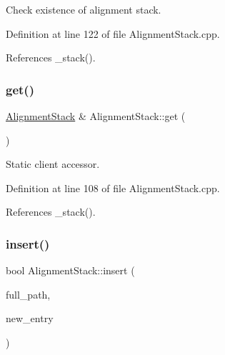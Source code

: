 Check existence of alignment stack. 



Definition at line 122 of file Alignment\+Stack.\+cpp.



References \+\_\+stack().

\hypertarget{class_d_d4hep_1_1_alignments_1_1_alignment_stack_aa39f02a46ed00baec0b3a09e42e3af1c}{}\label{class_d_d4hep_1_1_alignments_1_1_alignment_stack_aa39f02a46ed00baec0b3a09e42e3af1c} 
\subsubsection{\texorpdfstring{get()}{get()}}
{\footnotesize\ttfamily \hyperlink{class_d_d4hep_1_1_alignments_1_1_alignment_stack}{Alignment\+Stack} \& Alignment\+Stack\+::get (\begin{DoxyParamCaption}{ }\end{DoxyParamCaption})\hspace{0.3cm}{\ttfamily [static]}}



Static client accessor. 



Definition at line 108 of file Alignment\+Stack.\+cpp.



References \+\_\+stack().

\hypertarget{class_d_d4hep_1_1_alignments_1_1_alignment_stack_a9970de258fa1c3ea148a70de782f2398}{}\label{class_d_d4hep_1_1_alignments_1_1_alignment_stack_a9970de258fa1c3ea148a70de782f2398} 
\subsubsection{\texorpdfstring{insert()}{insert()}\hspace{0.1cm}{\footnotesize\ttfamily [1/2]}}
{\footnotesize\ttfamily bool Alignment\+Stack\+::insert (\begin{DoxyParamCaption}\item[{const std\+::string \&}]{full\+\_\+path,  }\item[{\hyperlink{class_d_d4hep_1_1dd4hep__ptr}{dd4hep\+\_\+ptr}$<$ \hyperlink{struct_d_d4hep_1_1_alignments_1_1_alignment_stack_1_1_stack_entry}{Stack\+Entry} $>$ \&}]{new\+\_\+entry }\end{DoxyParamCaption})}



